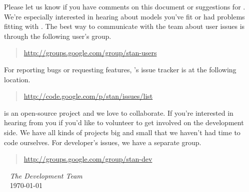 Please let us know if you have comments on this document or
suggestions for \Stan.  We're especially interested in hearing about
models you've fit or had problems fitting with \Stan.  The best way to
communicate with the \Stan team about user issues is through the
following user's group.
%
\begin{quote}
\url{http://groups.google.com/group/stan-users}
\end{quote}
%
For reporting bugs or requesting features, \Stan's issue tracker is at
the following location.
%
\begin{quote}
\url{http://code.google.com/p/stan/issues/list}
\end{quote}

\Stan is an open-source project and we love to collaborate.  If you're
interested in hearing from you if you'd like to volunteer to get
involved on the development side.  We have all kinds of projects big
and small that we haven't had time to code ourselves.  For developer's
issues, we have a separate group.
%
\begin{quote}
\url{http://groups.google.com/group/stan-dev}
\end{quote}

\vspace*{12pt}
\mbox{ } \hfill {\it The \Stan Development Team}
\\
\mbox{ } \hfill \today
